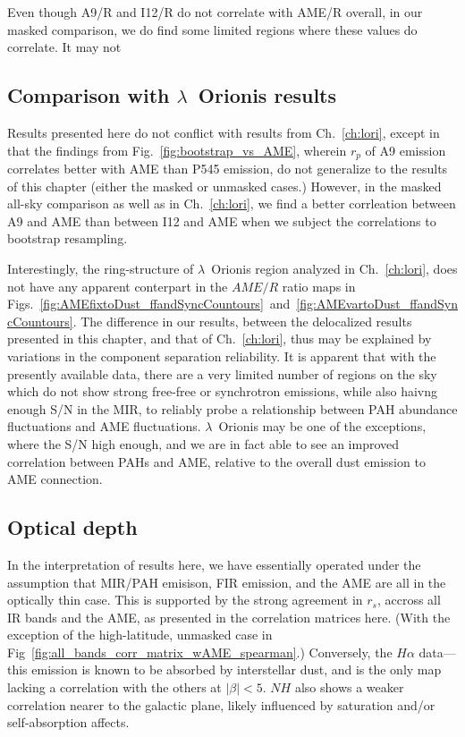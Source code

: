              Even though A9/R and I12/R do not correlate with AME/R overall, in our masked comparison, we do find some limited regions where these values do correlate. It may not

            \subsection{Comparison with $\lambda$~Orionis results}
                Results presented here do not conflict with results from Ch.~\ref{ch:lori}, except in that the findings from Fig.~\ref{fig:bootstrap_vs_AME}, wherein $r_{p}$ of A9 emission correlates better with AME than P545 emission, do not generalize to the results of this chapter (either the masked or unmasked cases.) However, in the masked all-sky comparison as well as in Ch.~\ref{ch:lori}, we find a better corrleation between A9 and AME than between I12 and AME when we subject the correlations to bootstrap resampling.

                Interestingly, the ring-structure of $\lambda$~Orionis region analyzed in Ch.~\ref{ch:lori}, does not have any apparent conterpart in the $AME/R$ ratio maps in Figs.~\ref{fig:AMEfixtoDust_ffandSyncCountours}~and~\ref{fig:AMEvartoDust_ffandSyncCountours}. The difference in our results, between the delocalized results presented in this chapter, and that of Ch.~\ref{ch:lori}, thus may be explained by variations in the component separation reliability. It is apparent that with the presently available data, there are a very limited number of regions on the sky which do not show strong free-free or synchrotron emissions, while also haivng enough S/N in the MIR, to reliably probe a relationship between PAH abundance fluctuations and AME fluctuations. $\lambda$~Orionis may be one of the exceptions, where the S/N high enough, and we are in fact able to see an improved correlation between PAHs and AME, relative to the overall dust emission to AME connection.
            \subsection{Optical depth}
              In the interpretation of results here, we have essentially operated under the assumption that MIR/PAH emisison, FIR emission, and the AME are all in the optically thin case. This is supported by the strong agreement in $r_{s}$, accross all IR bands and the AME, as presented in the correlation matrices here. (With the exception of the high-latitude, unmasked case in Fig~\ref{fig:all_bands_corr_matrix_wAME_spearman}.) Conversely, the $H{\alpha}$ data--- this emission is known to be absorbed by interstellar dust, and is the only map lacking a correlation with the others at $|\beta{}|<5$. $N{H}$ also shows a weaker correlation nearer to the galactic plane, likely influenced by saturation and/or self-absorption affects.

